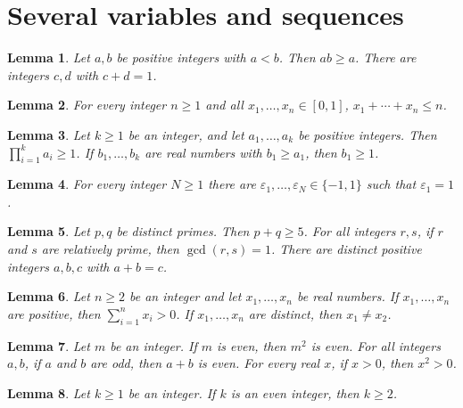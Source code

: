 \documentclass{article}
\newtheorem{lemma}{Lemma}
\begin{document}
\section{Several variables and sequences}

\begin{lemma}\label{plural}
Let $a,b$ be positive integers with $a<b$. Then $ab\ge a$. There are integers $c,d$ with $c+d=1$.
\end{lemma}

\begin{lemma}\label{sequence}
For every integer $n\ge1$ and all $x_1,\ldots,x_n\in[0,1]$, $x_1+\cdots+x_n\le n$.
\end{lemma}

\begin{lemma}\label{sequence-let}
Let $k\ge1$ be an integer, and let $a_1,\ldots,a_k$ be positive integers. Then $\prod_{i=1}^k a_i\ge1$. If $b_1,\dots,b_k$ are real numbers with $b_1\ge a_1$, then $b_1\ge1$.
\end{lemma}

\begin{lemma}\label{signs}
For every integer $N\ge1$ there are $\varepsilon_1,\ldots,\varepsilon_N\in\{-1,1\}$ such that $\varepsilon_1=1$.
\end{lemma}

\begin{lemma}\label{collective}
Let $p,q$ be distinct primes. Then $p+q\ge5$. For all integers $r,s$, if $r$ and $s$ are relatively prime, then $\gcd(r,s)=1$. There are distinct positive integers $a,b,c$ with $a+b=c$.
\end{lemma}

\begin{lemma}\label{sequence-adjectives}
Let $n\ge2$ be an integer and let $x_1,\ldots,x_n$ be real numbers. If $x_1,\ldots,x_n$ are positive, then $\sum_{i=1}^n x_i>0$. If $x_1,\ldots,x_n$ are distinct, then $x_1\ne x_2$.
\end{lemma}

\begin{lemma}\label{hypothesis-clause}
Let $m$ be an integer. If $m$ is even, then $m^2$ is even. For all integers $a,b$, if $a$ and $b$ are odd, then $a+b$ is even. For every real $x$, if $x>0$, then $x^2>0$.
\end{lemma}

\begin{lemma}\label{hypothesis-noun}
Let $k\ge1$ be an integer. If $k$ is an even integer, then $k\ge2$.
\end{lemma}
\end{document}

